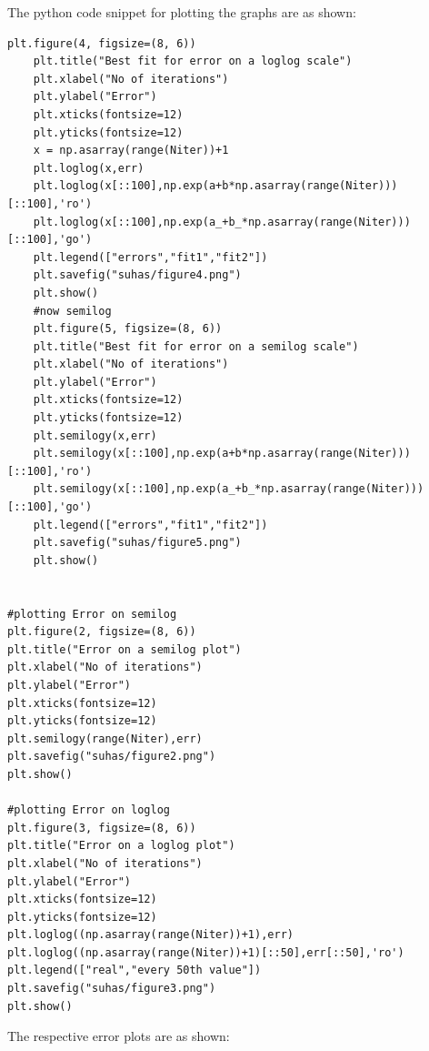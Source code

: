 \documentclass[11pt, a4paper]{article}
\begin{document}
The python code snippet for plotting the graphs are as shown:
 \begin{verbatim}
plt.figure(4, figsize=(8, 6))
    plt.title("Best fit for error on a loglog scale")
    plt.xlabel("No of iterations")
    plt.ylabel("Error")
    plt.xticks(fontsize=12)
    plt.yticks(fontsize=12)
    x = np.asarray(range(Niter))+1
    plt.loglog(x,err)
    plt.loglog(x[::100],np.exp(a+b*np.asarray(range(Niter)))[::100],'ro')
    plt.loglog(x[::100],np.exp(a_+b_*np.asarray(range(Niter)))[::100],'go')
    plt.legend(["errors","fit1","fit2"])
    plt.savefig("suhas/figure4.png")
    plt.show()
    #now semilog
    plt.figure(5, figsize=(8, 6))
    plt.title("Best fit for error on a semilog scale")
    plt.xlabel("No of iterations")
    plt.ylabel("Error")
    plt.xticks(fontsize=12)
    plt.yticks(fontsize=12)
    plt.semilogy(x,err)
    plt.semilogy(x[::100],np.exp(a+b*np.asarray(range(Niter)))[::100],'ro')
    plt.semilogy(x[::100],np.exp(a_+b_*np.asarray(range(Niter)))[::100],'go')
    plt.legend(["errors","fit1","fit2"])
    plt.savefig("suhas/figure5.png")
    plt.show()


#plotting Error on semilog
plt.figure(2, figsize=(8, 6))
plt.title("Error on a semilog plot")
plt.xlabel("No of iterations")
plt.ylabel("Error")
plt.xticks(fontsize=12)
plt.yticks(fontsize=12)
plt.semilogy(range(Niter),err)
plt.savefig("suhas/figure2.png")
plt.show()

#plotting Error on loglog
plt.figure(3, figsize=(8, 6))
plt.title("Error on a loglog plot")
plt.xlabel("No of iterations")
plt.ylabel("Error")
plt.xticks(fontsize=12)
plt.yticks(fontsize=12)
plt.loglog((np.asarray(range(Niter))+1),err)
plt.loglog((np.asarray(range(Niter))+1)[::50],err[::50],'ro')
plt.legend(["real","every 50th value"])
plt.savefig("suhas/figure3.png")
plt.show()

\end{verbatim}       
\newpage
The respective error plots are as shown:
\end{document}
